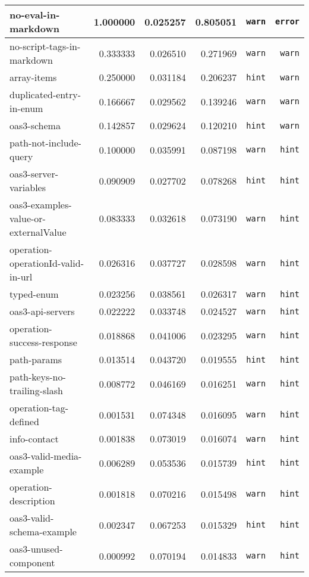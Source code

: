 {\begin{longtable}{lrrrrr}
no-eval-in-markdown &  1.000000 &  0.025257 & 0.805051 & \texttt{warn} & \texttt{error} \\ \hline
no-script-tags-in-markdown & 0.333333 &  0.026510 & 0.271969 & \texttt{warn} & \texttt{warn} \\
array-items &  0.250000 &  0.031184 & 0.206237 & \texttt{hint} & \texttt{warn} \\
duplicated-entry-in-enum & 0.166667 &  0.029562 & 0.139246 & \texttt{warn} & \texttt{warn} \\
oas3-schema &  0.142857 &  0.029624 & 0.120210 & \texttt{hint} & \texttt{warn} \\ \hline
path-not-include-query & 0.100000 &  0.035991 & 0.087198 & \texttt{warn} & \texttt{hint} \\
oas3-server-variables &  0.090909 &  0.027702 & 0.078268 & \texttt{hint} & \texttt{hint} \\
oas3-examples-value-or-externalValue & 0.083333 &  0.032618 & 0.073190 & \texttt{warn} & \texttt{hint} \\
operation-operationId-valid-in-url & 0.026316 &  0.037727 & 0.028598 & \texttt{warn} & \texttt{hint} \\
typed-enum & 0.023256 &  0.038561 & 0.026317 & \texttt{warn} & \texttt{hint} \\
oas3-api-servers & 0.022222 &  0.033748 & 0.024527 & \texttt{warn} & \texttt{hint} \\
operation-success-response & 0.018868 &  0.041006 & 0.023295 & \texttt{warn} & \texttt{hint} \\
path-params &  0.013514 &  0.043720 & 0.019555 & \texttt{hint} & \texttt{hint} \\
path-keys-no-trailing-slash &  0.008772 &  0.046169 & 0.016251 & \texttt{warn} & \texttt{hint} \\
operation-tag-defined &  0.001531 &  0.074348 & 0.016095 & \texttt{warn} & \texttt{hint} \\
info-contact & 0.001838 &  0.073019 & 0.016074 & \texttt{warn} & \texttt{hint} \\
oas3-valid-media-example & 0.006289 &  0.053536 & 0.015739 & \texttt{hint} & \texttt{hint} \\
operation-description &  0.001818 &  0.070216 & 0.015498 & \texttt{warn} & \texttt{hint} \\
oas3-valid-schema-example &  0.002347 &  0.067253 & 0.015329 & \texttt{hint} & \texttt{hint} \\
oas3-unused-component &  0.000992 &  0.070194 & 0.014833 & \texttt{warn} & \texttt{hint} \\

\end{longtable}}
